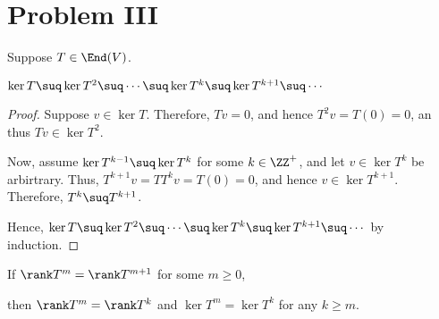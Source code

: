 \documentclass[11pt]{scrartcl}
\begin{document}
\section{Problem III}

Suppose $T \in \End(V)$.

\begin{lemma}
  \label{sec:problem-iii}
  $\ker T \suq \ker T^2 \suq \cdots \suq \ker T^k \suq \ker T^{k+1} \suq \cdots$
\end{lemma}

\begin{proof}
  \hfill

  Suppose $v \in \ker T$. Therefore, $Tv = 0$, and hence
  $T^2v = T(0) = 0$, an thus $Tv\in\ker T^2$.

  Now, assume $\ker T^{k-1} \suq \ker T^k$ for some $k\in\ZZ^+$, and
  let $v\in \ker T^k$ be arbirtrary. Thus,
  $T^{k+1}v = TT^kv = T(0) = 0$, and hence $v\in \ker
  T^{k+1}$. Therefore, $T^k\suq T^{k+1}$.

  Hence,
  $\ker T \suq \ker T^2 \suq \cdots \suq \ker T^k \suq \ker T^{k+1}
  \suq \cdots$ by induction.

\end{proof}

\begin{lemma}
  \label{sec:problem-iii-2}
  If $\rank T^m = \rank T^{m+1}$ for some $m\geq 0$,

  then $\rank T^m = \rank T^k$ and $\ker T^m = \ker T^k$ for any $k \geq m$.
\end{lemma}
\end{document}

